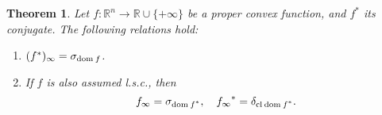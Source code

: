 \documentclass[a4paper,11pt, oneside]{book}
\newtheorem{thm}{Theorem}[section]
\theoremstyle{definition}
\newcommand{\RealNumberSet}{\mathbb{R}}
\newcommand{\NDemenstionalRealEuclideanSpace}{\mathbb{R}^n}
\newcommand{\Closure}[1]{\text{\rm cl\:${#1}$}} %
\newcommand{\Domain}[1]{\text{\rm dom\:${#1}$}} %
\newcommand{\ExtendedRealValuedFunction}[2]{{#1}: {#2} \to \RealNumberSet \cup \{+\infty\}}
\newcommand{\ConjugateFunction}[1]{{#1}^*}
\newcommand{\SupportFunction}[1]{\sigma_{#1}}
\newcommand{\IndicatorFunction}[1]{\delta_{#1}}
\begin{document}
\begin{thm}\label{propertiesOfAsymptoticFunctionsAndSupportFunctions}
  Let $\ExtendedRealValuedFunction{f}{\NDemenstionalRealEuclideanSpace}$ be a proper convex function, and $\ConjugateFunction{f}$ its conjugate. The following relations hold:
  \begin{enumerate}[label=\alph*,align=CenterWithParen]
    \item $(\ConjugateFunction{f})_{\infty} = \SupportFunction{\Domain{f}}$.
    \item If $f$ is also assumed l.s.c., then
    \begin{equation}
      f_{\infty} = \SupportFunction{\Domain{\ConjugateFunction{f}}},\quad \ConjugateFunction{f_{\infty}} = \IndicatorFunction{\Closure{\Domain{\ConjugateFunction{f}}}}. \notag
    \end{equation}
  \end{enumerate}
\end{thm}
\end{document}
